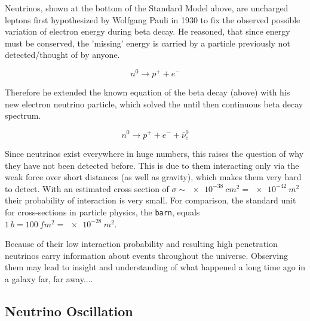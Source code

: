 \documentclass[a4paper,10pt]{scrartcl}
\begin{document}
\label{neutrinos}

Neutrinos, shown at the bottom of the Standard Model above, are uncharged leptons first hypothesized by Wolfgang Pauli in 1930 to fix the observed possible variation of electron energy during beta decay.
He reasoned, that since energy must be conserved, the 'missing' energy is carried by a particle previously not detected/thought of by anyone.

\begin{equation}
    n^0 \longrightarrow p^+ + e^-
\end{equation}

Therefore he extended the known equation of the beta decay (above) with his new electron neutrino particle, which solved the until then continuous beta decay spectrum.

\begin{equation}
    n^0 \longrightarrow p^+ + e^- + \bar{\nu}_e^0
\end{equation}

Since neutrinos exist everywhere in huge numbers, this raises the question of why they have not been detected before.
This is due to them interacting only via the weak force over short distances (as well as gravity), which makes them very hard to detect.
With an estimated cross section of $\sigma \sim \SI{e-38}{cm^2} = \SI{e-42}{m^2}$ their probability of interaction is very small.
For comparison, the standard unit for cross-sections in particle physics, the \texttt{barn}, equals $\SI{1}{b} = \SI{100}{fm^2} = \SI{e-28}{m^2}$.



Because of their low interaction probability and resulting high penetration neutrinos carry information about events throughout the universe.
Observing them may lead to insight and understanding of what happened a long time ago in a galaxy far, far away....

\subsection{Neutrino Oscillation}
\end{document}
